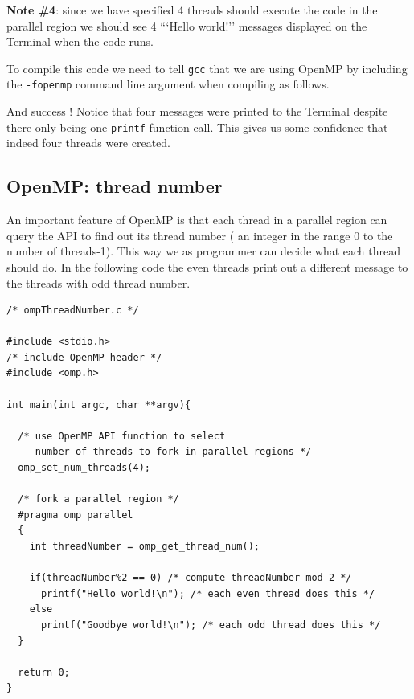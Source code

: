 {\bf Note \#4}: since we have specified 4 threads should execute the code in the parallel region we should see 4 ```Hello world!'' messages displayed on the Terminal when the code runs.

To compile this code we need to tell \texttt{gcc} that we are using OpenMP by including the \texttt{-fopenmp} command line argument when compiling as follows.


And success ! Notice that four messages were printed to the Terminal despite there only being one \texttt{printf} function call. This gives us some confidence that indeed four threads were created.

\subsection{OpenMP: thread number}

An important feature of OpenMP is that each thread in a parallel region can query the API to find out its thread number ( an integer in the range 0 to the number of threads-1). This way we as programmer can decide what each thread should do. In the following code the even threads print out a different message to the threads with odd thread number.

\begin{verbatim}
/* ompThreadNumber.c */

#include <stdio.h> 
/* include OpenMP header */
#include <omp.h>

int main(int argc, char **argv){

  /* use OpenMP API function to select 
     number of threads to fork in parallel regions */
  omp_set_num_threads(4);
  
  /* fork a parallel region */
  #pragma omp parallel   
  {
    int threadNumber = omp_get_thread_num();
  
    if(threadNumber%2 == 0) /* compute threadNumber mod 2 */
      printf("Hello world!\n"); /* each even thread does this */
    else
      printf("Goodbye world!\n"); /* each odd thread does this */
  }
  
  return 0;
}
\end{verbatim}

